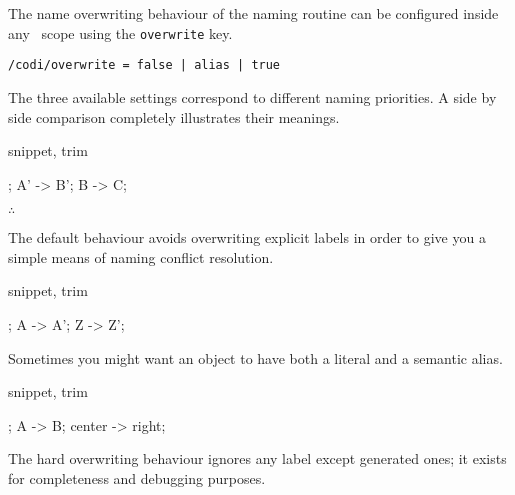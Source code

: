 The name overwriting behaviour of the naming routine can be configured
inside any \CoDi\ scope using the \lstinline!overwrite! key.

\begin{lstlisting}
/codi/overwrite = false | alias | true
\end{lstlisting}

The three available settings correspond to different naming priorities.
A side by side comparison completely illustrates their meanings.

\begin{tcblisting}{snippet, trim}
\begin{codi}
; %
\mor A' -> B';
\mor B  -> C;
\end{codi}
\end{tcblisting}

\hfill$\therefore$\hfill\null

The default behaviour avoids overwriting explicit labels in order
to give you a simple means of naming conflict resolution.

\begin{tcblisting}{snippet, trim}
\begin{codi}[tetragonal]
;
\mor A -> A';
\mor Z -> Z';
\end{codi}
\end{tcblisting}

Sometimes you might want an object to have both a literal and a
semantic alias.

\begin{tcblisting}{snippet, trim}
\begin{codi}
;
\mor A -> B;
\mor center -> right;
\end{codi}
\end{tcblisting}

The hard overwriting behaviour ignores any label except generated
ones; it exists for completeness and debugging purposes.
